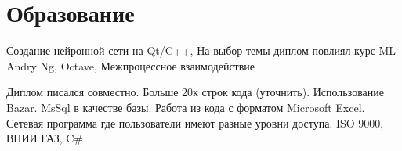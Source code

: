 \documentclass[a4paper]{curricula-vitae}
\begin{document}
\begin{minipage}[t]{0.66\textwidth}
\insertspace

\section{Образование} 


Создание нейронной сети на Qt/C++, На выбор темы диплом повлиял курс ML Andry Ng, Octave,
Межпроцессное взаимодействие

\insertspace


Диплом писался совместно. Больше 20к строк кода (уточнить). Использование Bazar.
MsSql в качестве базы. Работа из кода с форматом Microsoft Excel.
Сетевая программа где пользователи имеют разные уровни доступа.
ISO 9000, ВНИИ ГАЗ, C\#

\insertspace

\end{minipage} %

\end{document}
